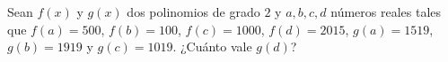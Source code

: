 Sean $f(x)$ y $g(x)$ dos polinomios de grado $2$ y $a,b,c,d$ números reales tales que $f(a) = 500$, $f(b) = 100$, $f(c) = 1000$, $f(d) = 2015$, $g(a) = 1519$, $g(b) = 1919$ y $g(c) = 1019$. ¿Cuánto vale $g(d)$?